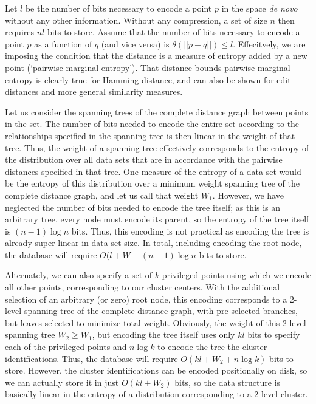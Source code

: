 \documentclass{amsbook}
\theoremstyle{definition}
\theoremstyle{remark}
\numberwithin{equation}{section}
\begin{document}
Let $l$ be the number of bits necessary to encode a point $p$ in the space \textit{de novo} without any other information.
Without any compression, a set of size $n$ then requires $nl$ bits to store.
Assume that the number of bits necessary to encode a point $p$ as a function of $q$ (and vice versa) is $\theta(||p-q||) \le l$.
Effecitvely, we are imposing the condition that the distance is a measure of entropy added by a new point (`pairwise marginal entropy').
That distance bounds pairwise marginal entropy is clearly true for Hamming distance, and can also be shown for edit distances and more general similarity measures.

Let us consider the spanning trees of the complete distance graph between points in the set.
The number of bits needed to encode the entire set according to the relationships specified in the spanning tree is then linear in the weight of that tree.
Thus, the weight of a spanning tree effectively corresponds to the entropy of the distribution over all data sets that are in accordance with the pairwise distances specified in that tree.
One measure of the entropy of a data set would be the entropy of this distribution over a minimum weight spanning tree of the complete distance graph, and let us call that weight $W_1$.
However, we have neglected the number of bits needed to encode the tree itself; as this is an arbitrary tree, every node must encode its parent, so the entropy of the tree itself is $ (n-1) \log n$ bits.
Thus, this encoding is not practical as encoding the tree is already super-linear in data set size.
In total, including encoding the root node, the database will require $O(l + W + (n-1)\log n$ bits to store.

Alternately, we can also specify a set of $k$ privileged points using which we encode all other points, corresponding to our cluster centers.
With the additional selection of an arbitrary (or zero) root node, this encoding corresponds to a 2-level spanning tree of the complete distance graph, with pre-selected branches, but leaves selected to minimize total weight.
Obviously, the weight of this 2-level spanning tree $W_2 \ge W_1$, but
encoding the tree itself uses only $kl$ bits to specify each of the privileged points and $n \log k$ to encode the tree the cluster identifications.
Thus, the database will require $O(kl + W_2 + n \log k)$ bits to store.
However, the cluster identifications can be encoded positionally on disk, so we can actually store it in just $O(kl + W_2)$ bits, so the data structure is basically linear in the entropy of a distribution corresponding to a 2-level cluster.
\end{document}
